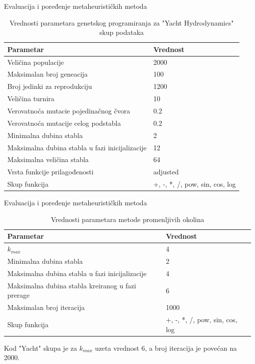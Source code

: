 \documentclass{beamer}
\begin{document}
\begin{frame}{Evaluacija i poređenje metaheurističkih metoda}
\scriptsize
\begin{table}[ht]
\caption{Vrednosti parametara genetskog programiranja za "Yacht Hydrodynamics" skup podataka} 
\label{tbl:gpParametersYacht}
\centering
\begin{tabular}{l l} %
\hline 
Parametar & Vrednost \\ [0.5ex] 
\hline 
Veličina populacije & 2000  \\ 
Maksimalan broj geneacija & 100  \\
Broj jedinki za reprodukciju & 1200  \\
Veličina turnira & 10 \\
Verovatnoća mutacie pojedinačnog čvora & 0.2  \\
Verovatnoća mutacije celog podstabla & 0.2  \\ 
Minimalna dubina stabla & 2 \\
Maksimalna dubina stabla u fazi inicijalizacije & 12 \\
Maksimalna veličina stabla & 64 \\
Vrsta funkcije prilagođenosti & adjusted \\ 
Skup funkcija &  +, -, *, /, pow, sin, cos, log \\ [1ex] %
\hline 
\end{tabular}
\end{table}
\end{frame}

\begin{frame}{Evaluacija i poređenje metaheurističkih metoda}
\scriptsize
\begin{table}[H]
\caption{Vrednosti parametara metode promenljivih okolina} 
\label{tbl:vnpParameters}
\centering
\begin{tabular}{l l} %
\hline 
Parametar & Vrednost \\ [0.5ex] 
\hline 
$k_{max}$ & 4  \\ 
Minimalna dubina stabla & 2 \\
Maksimalna dubina stabla u fazi inicijalizacije & 4 \\
Maksimalna dubina stabla kreiranog u fazi prerage  & 6 \\
Maksimalan broj iteracija & 1000 \\ 
Skup funkcija &  +, -, *, /, pow, sin, cos, log \\ [1ex] %
\hline 
\end{tabular}
\end{table}

Kod "Yacht" skupa je za $k_{max}$ uzeta vrednost 6, a broj iteracija je povećan na 2000.

\end{frame}
\end{document}
